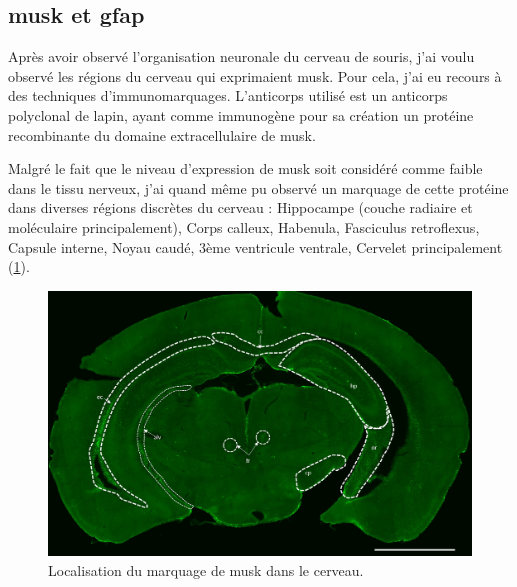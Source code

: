 	
	
	\subsection{\acrshort{musk} et \acrshort{gfap}}
	\label{ssec:musk}
	Après avoir observé l'organisation neuronale du cerveau de souris, j'ai voulu observé les régions du cerveau qui exprimaient \gls{musk}. Pour cela, j'ai eu recours à des techniques d'immunomarquages. L'anticorps utilisé est un anticorps polyclonal de lapin, ayant comme immunogène pour sa création un protéine recombinante du domaine extracellulaire de \gls{musk}.
	
	Malgré le fait que le niveau d'expression de \gls{musk} soit considéré comme faible dans le tissu nerveux, j'ai quand même pu observé un marquage de cette protéine dans diverses régions discrètes du cerveau : Hippocampe (couche radiaire et moléculaire principalement), Corps calleux, Habenula, Fasciculus retroflexus, Capsule interne, Noyau caudé, 3ème ventricule ventrale, Cervelet principalement (\cref{fig:ImmunoMusk}). 
	
	\begin{figure}[h] %
		\begin{center}
			\includegraphics[width=\textwidth]{./Images/Immuno/Musk/loca_MuSK.jpg}
		\end{center}
		\caption{Localisation du marquage de \gls{musk} dans le cerveau.}
		\label{fig:ImmunoMusk}
	\end{figure}
	
